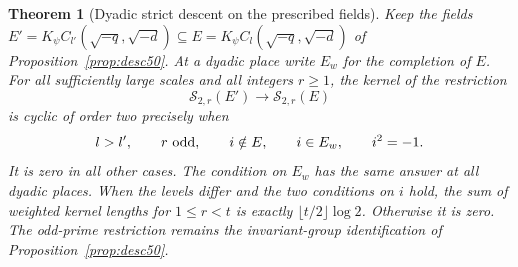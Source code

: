 \documentclass[a4paper,11pt]{article}
\newtheorem{theorem}[proposition]{Theorem}
\theoremstyle{definition}
\theoremstyle{remark}
\numberwithin{equation}{section}
\begin{document}
\begin{theorem}[Dyadic strict descent on the prescribed fields]\label{thm:sharp51}
Keep the fields \(E'=K_\psi C_{l'}(\sqrt{-q},\sqrt{-d})\subseteq
E=K_\psi C_l(\sqrt{-q},\sqrt{-d})\) of
Proposition~\ref{prop:desc50}. At a dyadic place write \(E_w\) for the
completion of \(E\). For all sufficiently large scales and all integers
\(r\ge1\), the kernel of the restriction
\[
        \mathcal S_{2,r}(E')\longrightarrow\mathcal S_{2,r}(E)
\]
is cyclic of order two precisely when
\[
 l>l',\qquad r\ {\rm odd},\qquad i\notin E,\qquad i\in E_w,
                  \qquad i^2=-1.                              \label{eq:roots51}
\]
It is zero in all other cases. The condition on \(E_w\) has the same
answer at all dyadic places. When the levels differ and the two
conditions on \(i\) hold, the sum of weighted kernel lengths for
\(1\le r<t\) is exactly \(\lfloor t/2\rfloor\log 2\). Otherwise it is
zero. The odd-prime restriction remains the invariant-group
identification of Proposition~\ref{prop:desc50}.
\end{theorem}
\end{document}
